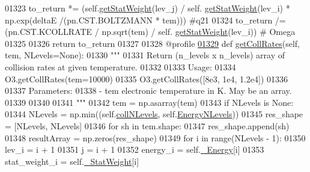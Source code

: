 \begin{DoxyCode}
{{01323                 to\_return *= (self.\hyperlink{classpyneb_1_1core_1_1pynebcore_1_1_atom_a0f2483487115f19556586b9e422bd5fb}{getStatWeight}(lev\_j) / self.
      \hyperlink{classpyneb_1_1core_1_1pynebcore_1_1_atom_a0f2483487115f19556586b9e422bd5fb}{getStatWeight}(lev\_i) * np.exp(deltaE /(pn.CST.BOLTZMANN * tem))) \textcolor{comment}{#q21}
01324                 to\_return /= (pn.CST.KCOLLRATE / np.sqrt(tem) / self.
      \hyperlink{classpyneb_1_1core_1_1pynebcore_1_1_atom_a0f2483487115f19556586b9e422bd5fb}{getStatWeight}(lev\_i)) \textcolor{comment}{# Omega}
01325                 
01326         \textcolor{keywordflow}{return} to\_return
01327     
01328     @profile
\hypertarget{pynebcore_8py_source_l01329}{}\hyperlink{classpyneb_1_1core_1_1pynebcore_1_1_atom_a34711ea989baf7bde752a68255d32098}{01329}     \textcolor{keyword}{def }\hyperlink{classpyneb_1_1core_1_1pynebcore_1_1_atom_a34711ea989baf7bde752a68255d32098}{getCollRates}(self, tem, NLevels=None):
01330         \textcolor{stringliteral}{"""}
01331 \textcolor{stringliteral}{        Return (n\_levels x n\_levels) array of collision rates at given temperature. }
01332 \textcolor{stringliteral}{        }
01333 \textcolor{stringliteral}{        Usage:}
01334 \textcolor{stringliteral}{            O3.getCollRates(tem=10000)}
01335 \textcolor{stringliteral}{            O3.getCollRates([8e3, 1e4, 1.2e4])}
01336 \textcolor{stringliteral}{        }
01337 \textcolor{stringliteral}{        Parameters:}
01338 \textcolor{stringliteral}{            - tem     electronic temperature in K. May be an array.}
01339 \textcolor{stringliteral}{}
01340 \textcolor{stringliteral}{}
01341 \textcolor{stringliteral}{        """}
01342         tem = np.asarray(tem)
01343         \textcolor{keywordflow}{if} NLevels \textcolor{keywordflow}{is} \textcolor{keywordtype}{None}:
01344             NLevels = np.min((self.\hyperlink{classpyneb_1_1core_1_1pynebcore_1_1_atom_a8beaa0244d575054b3e2748a5e00d8db}{collNLevels}, self.\hyperlink{classpyneb_1_1core_1_1pynebcore_1_1_atom_a03277bf57e7056ec2199cc89f2a007aa}{EnergyNLevels}))
01345         res\_shape = [NLevels, NLevels]
01346         \textcolor{keywordflow}{for} sh \textcolor{keywordflow}{in} tem.shape:
01347             res\_shape.append(sh)
01348         resultArray = np.zeros(res\_shape)
01349         \textcolor{keywordflow}{for} i \textcolor{keywordflow}{in} range(NLevels - 1):
01350             lev\_i = i + 1
01351             j = i + 1
01352             energy\_i = self.\hyperlink{classpyneb_1_1core_1_1pynebcore_1_1_atom_a52e68715246d258bf0a14f4bd06e89e4}{\_Energy}[i]
01353             stat\_weight\_i = self.\hyperlink{classpyneb_1_1core_1_1pynebcore_1_1_atom_a1e76c66b89eb327aeb4cdb1d8bd46fb5}{\_StatWeight}[i]
}}
\end{DoxyCode}
